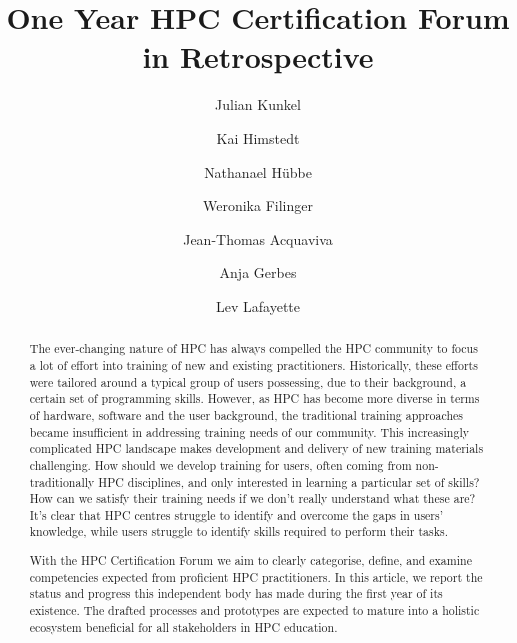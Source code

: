 \documentclass[jocse]{jocseart}
\begin{document}
\title{One Year HPC Certification Forum in Retrospective}

\author{Julian Kunkel}


\author{Kai Himstedt}
\author{Nathanael Hübbe}

\author{Weronika Filinger}

\author{Jean-Thomas Acquaviva}


\author{Anja Gerbes}

\author{Lev Lafayette}

\renewcommand{\shortauthors}{J. Kunkel et al.}


\begin{abstract}

The ever-changing nature of HPC has always compelled the HPC community to focus a lot of effort into training of new and existing practitioners. Historically, these efforts were tailored
 around a typical group of users possessing, due to their background, a certain set of programming skills. However, as HPC has become more diverse in terms of hardware, software and
 the user background, the traditional training approaches became insufficient in addressing training needs of our community. This increasingly complicated HPC landscape makes
 development and delivery of new training materials challenging. How should we develop training for users, often coming from non-traditionally HPC disciplines, and only interested in
 learning a particular set of skills? How can we satisfy their training needs if we don't really understand what these are? It's clear that HPC centres struggle to identify and overcome the
 gaps in users' knowledge, while users struggle to identify skills required to perform their tasks.

With the HPC Certification Forum we aim to clearly categorise, define, and examine competencies expected from proficient HPC practitioners.
In this article, we report the status and progress this independent body has made during the first year of its existence. The drafted processes and prototypes are expected to mature into a
holistic ecosystem beneficial for all stakeholders in HPC education.
\end{abstract}
\end{document}
